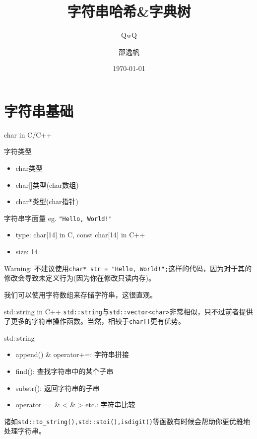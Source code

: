 \documentclass{ldr-simple-gray}
\title{字符串哈希\&字典树}
\subtitle{QwQ}
\author{邵逸帆}
\institute[] {
  23电信基地班\\
  兰州大学算法与程序设计集训队
}
\date{\today}
\begin{document}
  \frame{\titlepage} %

  \section{字符串基础}
  \begin{frame}{char in C/C++}
    \begin{block}{字符类型}
      \begin{itemize}
        \item char类型
        \item char[]类型(char数组)
        \item char*类型(char指针)
      \end{itemize}
    \end{block}
    
    \begin{block}{字符串字面量}
      eg. \texttt{"Hello, World!"}
      \begin{itemize}
        \item type: char[14] in C, const char[14] in C++
        \item size: 14
      \end{itemize}

      Warning: 不建议使用\texttt{char* str = "Hello, World!";}这样的代码，因为对于其的修改会导致未定义行为(因为你在修改只读内存)。
    \end{block}

    我们可以使用字符数组来存储字符串，这很直观。
  \end{frame}

  \begin{frame}{std::string in C++}
    \texttt{std::string}与\texttt{std::vector<char>}非常相似，只不过前者提供了更多的字符串操作函数。当然，相较于\texttt{char[]}更有优势。

    \begin{block}{std::string}
      \begin{itemize}
        \item append() \& operator+=: 字符串拼接
        \item find(): 查找字符串中的某个子串
        \item substr(): 返回字符串的子串
        \item operator== \& < \& > etc.: 字符串比较
      \end{itemize}
    \end{block}

    诸如\texttt{std::to\_string(),std::stoi(),isdigit()}等函数有时候会帮助你更优雅地处理字符串。
  \end{frame}
\end{document}
